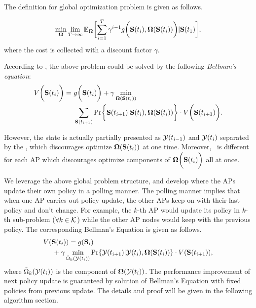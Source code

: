 The definition for global optimization problem is given as follows.
\begin{problem}
    \begin{gather}
        \min_{\Policy} \lim_{T \to \infty}
            \mathbb{E}_{\Policy}
                \Bracket{\sum_{i=1}^{T} \gamma^{i-1} g\Paren{\Stat(t_{i}), \Policy(\Stat(t_{i}))}|\Stat(t_1)},
    \end{gather}
    where the cost is collected with a discount factor $\gamma$.
\end{problem}
\noindent According to \cite{sutton1998introduction}, the above problem could be solved by the following \emph{Bellman's equation}:
\begin{align}
    V\Paren{\Stat(t_{i})} =~&g\Paren{\Stat(t_{i})} + \gamma \min_{\Policy(\Stat(t_{i}))}
        \nonumber\\
        &\sum_{\Stat(t_{i+1})} \Pr\Brace{ \Stat(t_{i+1})|\Stat(t_{i}), \Policy(\Stat(t_{i})) } \cdot V\Paren{\Stat(t_{i+1})}.
    \label{sp_0}
\end{align}

However, the state is actually partially presented as $\mathcal{Y}(t_{i-1})$ and $\mathcal{Y}(t_{i})$ separated by the \brdelay, which discourages optimize $\boldsymbol{\Omega}(\mathbf{S}(t_{i}))$ at one time.
Moreover, \brdelay~is different for each AP which discourages optimize components of $\boldsymbol{\Omega}\bigg(\mathbf{S}(t_{i})\bigg)$ all at once.

We leverage the above global problem structure, and develop  where the APs update their own policy  in a polling manner.
The polling manner implies that when one AP carries out policy update, the other APs keep on with their last policy and don't change.
For example, the $k$-th AP would update its policy in $k$-th sub-problem ($\forall k\in\mathcal{K}$) while the other AP nodes would keep with the previous policy. The corresponding Bellman's Equation is given as follows.
\begin{align}
    &V(\mathbf{S}(t_{i})) = g(\mathbf{S}_{i}) 
    \nonumber\\
    &~~~~+ \gamma \min_{\tilde{\Omega}_{k}(\mathcal{Y}(t_{i}))} \Pr\{ \mathcal{Y}(t_{i+1})|\mathcal{Y}(t_{i}), \boldsymbol{\Omega}(\mathbf{S}(t_{i})) \} \cdot V(\mathbf{S}(t_{i+1})),
    \label{sp_k}
\end{align}
where $\tilde{\Omega}_{k}(\mathcal{Y}(t_{i}))$ is the component of $\boldsymbol{\Omega}(\mathcal{Y}(t_{i}))$.
The performance improvement of next policy update is guaranteed by solution of Bellman's Equation with fixed policies from previous update.
The details and proof will be given in the following algorithm section.        

